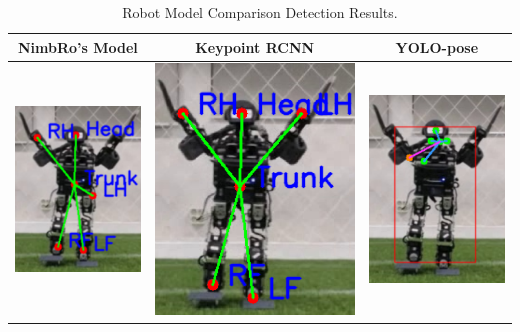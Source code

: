 \def\arraystretch{0.5}
\begin{longtable}{|c|c|c|}
  \caption{Robot Model Comparison Detection Results.}
  \label{tb:robotmodelcomparisondetectionresults}\\
  \hline
  \rowcolor[HTML]{C0C0C0}
  \textbf{NimbRo's Model}    & \textbf{Keypoint RCNN} & \textbf{YOLO-pose}\\
  \hline
  \includegraphics[scale=0.85]{gambar/nimbro-1.png} & \includegraphics[scale=0.48]{gambar/rcnn-1.png} & \includegraphics[scale=0.66]{gambar/yolo-1.png} \\

\end{longtable}
